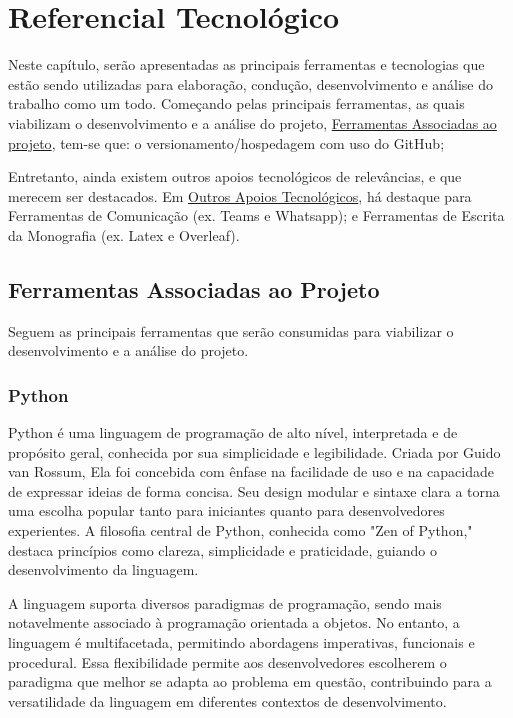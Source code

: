\chapter[Referencial Tecnológico]{Referencial Tecnológico}
\label{chap:tecnologico}

Neste capítulo, serão apresentadas as principais ferramentas e tecnologias que estão sendo utilizadas para elaboração, condução, desenvolvimento e análise do trabalho como um todo. Começando pelas principais ferramentas, as quais viabilizam o desenvolvimento e a análise do projeto, \hyperref[sec:principal]{Ferramentas Associadas ao projeto}, tem-se que: o versionamento/hospedagem com uso do GitHub; 

Entretanto, ainda existem outros apoios tecnológicos de relevâncias, e que merecem ser destacados. Em \hyperref[sec:demais]{Outros Apoios Tecnológicos}, há destaque para Ferramentas de Comunicação (ex. Teams e Whatsapp); e Ferramentas de Escrita da Monografia 
(ex. Latex e Overleaf).

\section{Ferramentas Associadas ao Projeto}
\label{sec:principal}

Seguem as principais ferramentas que serão consumidas para viabilizar o desenvolvimento e a análise do projeto.

\subsection{Python}

Python é uma linguagem de programação de alto nível, interpretada e de propósito geral, conhecida por sua simplicidade e legibilidade. Criada por Guido van Rossum, Ela foi concebida com ênfase na facilidade de uso e na capacidade de expressar ideias de forma concisa. Seu design modular e sintaxe clara a torna uma escolha popular tanto para iniciantes quanto para desenvolvedores experientes. A filosofia central de Python, conhecida como "Zen of Python," destaca princípios como clareza, simplicidade e praticidade, guiando o desenvolvimento da linguagem.

A linguagem suporta diversos paradigmas de programação, sendo mais notavelmente associado à programação orientada a objetos. No entanto, a linguagem é multifacetada, permitindo abordagens imperativas, funcionais e procedural. Essa flexibilidade permite aos desenvolvedores escolherem o paradigma que melhor se adapta ao problema em questão, contribuindo para a versatilidade da linguagem em diferentes contextos de desenvolvimento.

